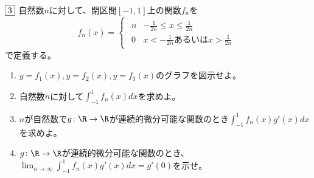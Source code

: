\begin{tcolorbox} %
	$\fbox{3}$ 自然数$n$に対して、閉区間$[-1, 1]$上の関数$f_n$を
\begin{equation*}
	f_n(x)=
\begin{cases}
\begin{matrix}
	n& -\frac{1}{2n}\le x\le \frac{1}{2n}\\
	0& x< -\frac{1}{2n}あるいは x> \frac{1}{2n}
\end{matrix}
\end{cases}
\end{equation*}
	で定義する。
\begin{enumerate}
	\item $y= f_1(x), y= f_2(x), y= f_3(x)$のグラフを図示せよ。
	\item 自然数$n$に対して$\int_{-1}^1 f_n(x) dx$を求めよ。
	\item $n$が自然数で$g\colon \R\to \R$が連続的微分可能な関数のとき$\int_{-1}^1 f_n(x)g'(x) dx$を求めよ。
	\item $g\colon \R\to \R$が連続的微分可能な関数のとき、$\lim_{n\to \infty}\int _{-1}^1 f_n(x)g'(x) dx= g'(0)$を示せ。
\end{enumerate}
\end{tcolorbox}

